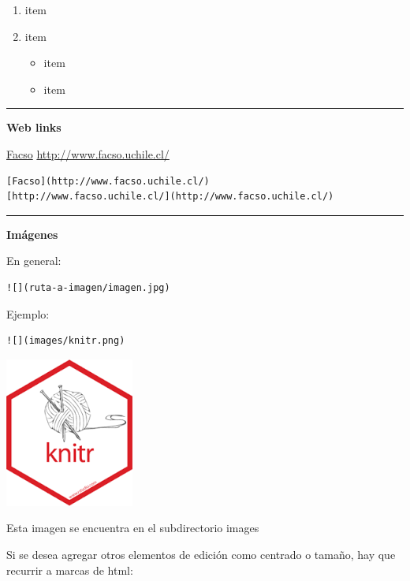 \documentclass[11pt,]{book}
\providecommand{\tightlist}{%
  \setlength{\itemsep}{0pt}\setlength{\parskip}{0pt}}
\begin{document}
\begin{enumerate}
\def\labelenumi{\arabic{enumi}.}
\tightlist
\item
  item
\item
  item

  \begin{itemize}
  \tightlist
  \item
    item
  \item
    item
  \end{itemize}
\end{enumerate}

\begin{center}\rule{0.5\linewidth}{\linethickness}\end{center}

\textbf{Web links}

\href{http://www.facso.uchile.cl/}{Facso}
\url{http://www.facso.uchile.cl/}

\begin{verbatim}
[Facso](http://www.facso.uchile.cl/)
[http://www.facso.uchile.cl/](http://www.facso.uchile.cl/)
\end{verbatim}

\begin{center}\rule{0.5\linewidth}{\linethickness}\end{center}

\textbf{Imágenes}

En general:

\begin{verbatim}
![](ruta-a-imagen/imagen.jpg)
\end{verbatim}

Ejemplo:

\begin{verbatim}
![](images/knitr.png)
\end{verbatim}

\includegraphics{images/knitr.png}

Esta imagen se encuentra en el subdirectorio images

Si se desea agregar otros elementos de edición como centrado o tamaño, hay que recurrir a marcas de html:
\end{document}
